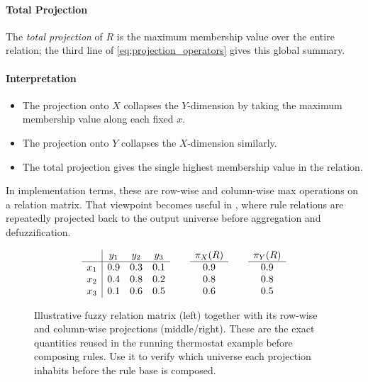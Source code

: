 \paragraph{Total Projection}

The \emph{total projection} of \( R \) is the maximum membership value over the entire relation; the third line of \eqref{eq:projection_operators} gives this global summary.

\paragraph{Interpretation}
\begin{itemize}
    \item The projection onto \( X \) collapses the \( Y \)-dimension by taking the maximum membership value along each fixed \( x \).
    \item The projection onto \( Y \) collapses the \( X \)-dimension similarly.
    \item The total projection gives the single highest membership value in the relation.
\end{itemize}
In implementation terms, these are row-wise and column-wise max operations on a relation matrix. That viewpoint becomes useful in , where rule relations are repeatedly projected back to the output universe before aggregation and defuzzification.

\begin{figure}[h]
    \centering
    \[
    \begin{array}{c@{\qquad}c@{\qquad}c}
        \begin{array}{c|ccc}
            & y_1 & y_2 & y_3 \\
            \hline
            x_1 & 0.9 & 0.3 & 0.1 \\
            x_2 & 0.4 & 0.8 & 0.2 \\
            x_3 & 0.1 & 0.6 & 0.5
        \end{array}
        &
        \begin{array}{c}
            \pi_X(R) \\
            \hline
            0.9 \\
            0.8 \\
            0.6
        \end{array}
        &
        \begin{array}{c}
            \pi_Y(R) \\
            \hline
            0.9 \\
            0.8 \\
            0.5
        \end{array}
    \end{array}
    \]
    \caption{Illustrative fuzzy relation matrix (left) together with its row-wise and column-wise projections (middle/right). These are the exact quantities reused in the running thermostat example before composing rules. Use it to verify which universe each projection inhabits before the rule base is composed.}
    \label{fig:lec10_projection_matrix}
\end{figure}


